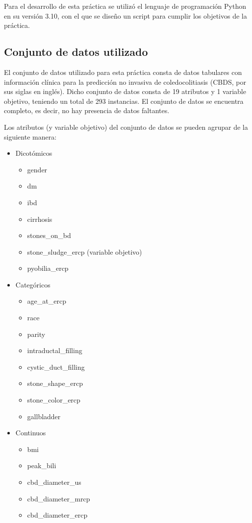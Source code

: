 Para el desarrollo de esta práctica se utilizó el lenguaje de programación Python en su versión 3.10, con el que se diseño un script para cumplir los objetivos de la práctica.

\subsection{Conjunto de datos utilizado}
El conjunto de datos utilizado para esta práctica consta de datos tabulares con información clínica para la predicción no invasiva de coledocolitiasis (CBDS, por sus siglas en inglés). Dicho conjunto de datos consta de 19 atributos y 1 variable objetivo, teniendo un total de 293 instancias. El conjunto de datos se encuentra completo, es decir, no hay presencia de datos faltantes.

Los atributos (y variable objetivo) del conjunto de datos se pueden agrupar de la siguiente manera:

\begin{itemize}
	\item Dicotómicos
	\begin{itemize}
		\item gender
		\item dm
		\item ibd
		\item cirrhosis
		\item stones\_on\_bd
		\item stone\_sludge\_ercp (variable objetivo)
		\item pyobilia\_ercp
	\end{itemize}
	\item Categóricos
	\begin{itemize}
		\item age\_at\_ercp
		\item race
		\item parity
		\item intraductal\_filling
		\item cystic\_duct\_filling
		\item stone\_shape\_ercp
		\item stone\_color\_ercp
		\item gallbladder
	\end{itemize}
	\item Continuos
	\begin{itemize}
		\item bmi
		\item peak\_bili
		\item cbd\_diameter\_us
		\item cbd\_diameter\_mrcp
		\item cbd\_diameter\_ercp
	\end{itemize}
\end{itemize}

